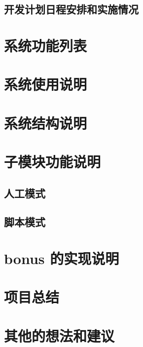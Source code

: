 \documentclass[12pt, a4paper]{ctexart}
\begin{document}
\subsection{开发计划日程安排和实施情况}

\section{系统功能列表}

\section{系统使用说明}

\section{系统结构说明}

\section{子模块功能说明}
\subsection{人工模式}

\subsection{脚本模式}

\section{bonus 的实现说明}


\section{项目总结}


\section{其他的想法和建议}
\end{document}
